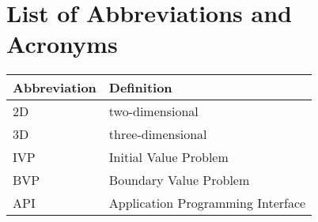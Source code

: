 \documentclass{stdlocal}
\begin{document}
  \section*{List of Abbreviations and Acronyms}

  \begin{table}[H]
    \center
    \renewcommand{\arraystretch}{1.3}
    \begin{tabularx}{\textwidth}{lX}
      \hline
      \textbf{Abbreviation} & \textbf{Definition} \\
      \hline
      \hline
      2D & two-dimensional \\
      3D & three-dimensional \\
      IVP & Initial Value Problem \\
      BVP & Boundary Value Problem \\
      API & Application Programming Interface \\
      \hline
    \end{tabularx}
  \end{table}
\end{document}
